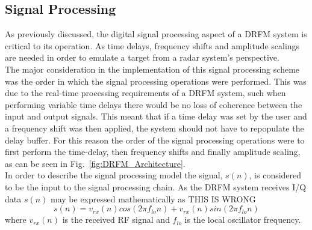 	\subsection{Signal Processing}
	\noindent As previously discussed, the digital signal processing aspect of a DRFM system is critical to its operation. As time delays, frequency shifts and amplitude scalings are needed in order to emulate a target from a radar system's perspective. \\ \newline The major consideration in the implementation of this signal processing scheme was the order in which the signal processing operations were performed. This was due to the real-time processing requirements of a DRFM system, such when performing variable time delays there would be no loss of coherence between the input and output signals. This meant that if a time delay was set by the user and a frequency shift was then applied, the system should not have to repopulate the delay buffer. For this reason the order of the signal processing operations were to first perform the time-delay, then frequency shifts and finally amplitude scaling, as can be seen in Fig.~\ref{fig:DRFM_Architecture}. \\ \newline In order to describe the signal processing model the signal, $s(n)$, is considered to be the input to the signal processing chain. As the DRFM system receives I/Q data $s(n)$ may be  expressed mathematically as
	{\color{red}  THIS IS WRONG}
	\begin{equation}
		s(n) = v_{rx}(n)cos(2\pi f_{lo} n) + v_{rx}(n)sin(2\pi f_{lo} n) 
	\end{equation}
	\noindent where $v_{rx}(n)$ is the received RF signal and $f_{lo}$ is the local oscillator frequency.\\
		
